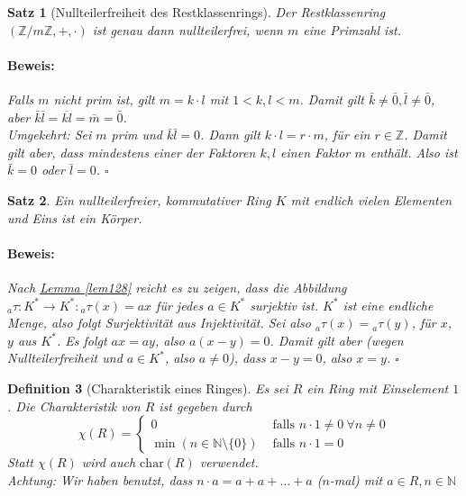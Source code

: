 \documentclass{report}
\newcommand{\IN}[1]{\index{#1|BH}}
\newcommand{\N}{\mathbb{N}}
\newcommand{\Z}{\mathbb{Z}}
\theoremstyle{customrem}
\theoremstyle{customdef}
\newtheorem{definition}{Definition}[chapter]
\newtheorem{satz}[definition]{Satz}
\renewenvironment{proof}{\vspace{-.75cm}\paragraph{Beweis: }}{\vspace{-.5cm}\hfill$\square$}
\begin{document}
	\begin{satz}[Nullteilerfreiheit des Restklassenrings]
		Der Restklassenring $(\Z/m\Z, +, \cdot)$ ist genau dann nullteilerfrei, wenn $m$ eine Primzahl ist.\\
		
		\begin{proof}
			Falls $m$ nicht prim ist, gilt $m = k \cdot l$ mit $1 < k, l < m$. Damit gilt $\bar{k} \neq \bar{0}, \bar{l} \neq \bar{0}$, aber $\bar{k} \bar{l}= \overline{kl} = \bar{m} = \bar{0}$.\\
			\noindent
			Umgekehrt: Sei $m$ prim und $\bar{k} \bar{l} = 0$. Dann gilt $k \cdot l= r \cdot m$, für ein $r \in \Z$. Damit gilt aber, dass mindestens einer der Faktoren $k, l$ einen Faktor $m$ enthält. Also ist $\bar{k} = 0$ oder $\bar{l} = 0$.
		\end{proof}
	\end{satz}
	
	\vspace{.2cm}
	
	\begin{satz}
		Ein nullteilerfreier, kommutativer Ring $K$ mit endlich vielen Elementen und Eins ist ein Körper.\\
		
		\begin{proof}
			Nach \hyperref[lem128]{Lemma \ref{lem128}} reicht es zu zeigen, dass die Abbildung ${}_{a}\tau : K^* \to K^* : {}_{a}\tau(x) = ax$ für jedes $a \in K^\ast$ surjektiv ist. $K^\ast$ ist eine endliche Menge, also folgt Surjektivität aus Injektivität. Sei also ${}_a\tau(x) = {}_a\tau(y)$, für $x$, $y$ aus $K^\ast$. Es folgt $ax = ay$, also $a (x - y) = 0$. Damit gilt aber  (wegen Nullteilerfreiheit und $a \in K^\ast$, also $a \neq 0$), dass $x - y = 0$, also $x = y$.
		\end{proof}
	\end{satz}
	
	\vspace{.2cm}

	\begin{definition}[Charakteristik eines Ringes]
		\IN{Ring!Charakteristik}
		Es sei $R$ ein Ring mit Einselement $1$. Die Charakteristik von $R$ ist gegeben durch\\
		$$\chi(R) = 
			\begin{cases}
				0 & \text{ falls } n \cdot 1 \neq 0\ \forall n \neq 0\\
				\min\left(n \in \N \setminus \{0\}\right) &\text{ falls } n \cdot 1 = 0
			\end{cases}
		$$
		Statt $\chi(R)$ wird auch $\mathrm{char}(R)$ verwendet.\\
		\emph{Achtung}: Wir haben benutzt, dass $n \cdot a = a + a + \dots + a$ ($n$-mal) mit $a \in R, n \in \N$
	\end{definition}
	
\end{document}

